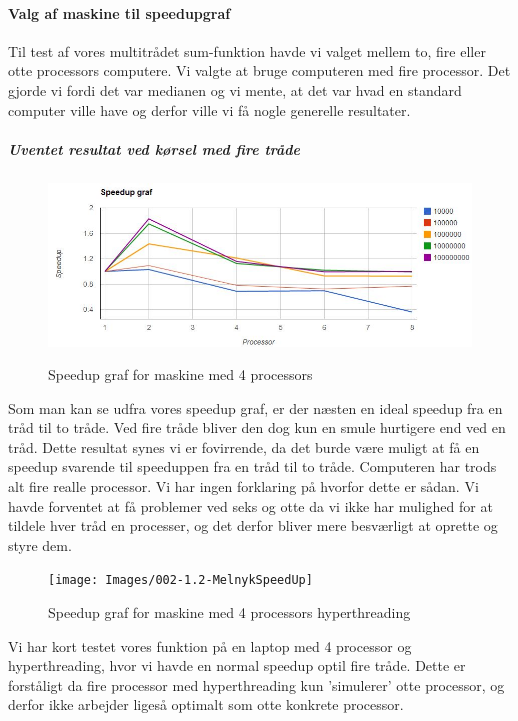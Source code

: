 \paragraph{Valg af maskine til speedupgraf}
Til test af vores multitrådet sum-funktion havde vi valget mellem to, fire eller otte processors computere. Vi valgte at bruge computeren med fire processor. Det gjorde vi fordi det var medianen og vi mente, at det var hvad en standard computer ville have og derfor ville vi få nogle generelle resultater. 

\subparagraph{Uventet resultat ved kørsel med fire tråde}

\begin{figure}[h!]
\centering
\caption{Speedup graf for maskine med 4 processors}
\includegraphics{Images/oo2-1.2-FrederikSpeedUp}
\label{FrederikSpeed}
\end{figure}

Som man kan se udfra vores speedup graf, er der næsten en ideal speedup fra en tråd til to tråde. Ved fire tråde bliver den dog kun en smule hurtigere end ved en tråd. Dette resultat synes vi er fovirrende, da det burde være muligt at få en speedup svarende til speeduppen fra en tråd til to tråde. Computeren har trods alt fire realle processor. Vi har ingen forklaring på hvorfor dette er sådan. 
Vi havde forventet at få problemer ved seks og otte da vi ikke har mulighed for at tildele hver tråd en processer, og det derfor bliver mere besværligt at oprette og styre dem. 


\begin{figure}[h!]
\centering
\caption{Speedup graf for maskine med 4 processors hyperthreading}
\texttt{[image: Images/002-1.2-MelnykSpeedUp]}
\label{MelnykSpeed}
\end{figure}


Vi har kort testet vores funktion på en laptop med 4 processor og hyperthreading, hvor vi havde en normal speedup optil fire tråde. Dette er forståligt da fire processor med hyperthreading kun 'simulerer' otte processor, og derfor ikke arbejder ligeså optimalt som otte konkrete processor.

